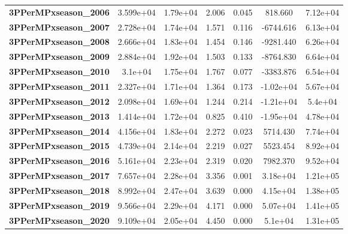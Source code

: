 \begin{center}
\begin{tabular}{lcccccc}
\textbf{3PPerMPxseason\_2006} &    3.599e+04  &     1.79e+04     &     2.006  &         0.045        &      818.660    &     7.12e+04     \\
\textbf{3PPerMPxseason\_2007} &    2.728e+04  &     1.74e+04     &     1.571  &         0.116        &    -6744.616    &     6.13e+04     \\
\textbf{3PPerMPxseason\_2008} &    2.666e+04  &     1.83e+04     &     1.454  &         0.146        &    -9281.440    &     6.26e+04     \\
\textbf{3PPerMPxseason\_2009} &    2.884e+04  &     1.92e+04     &     1.503  &         0.133        &    -8764.830    &     6.64e+04     \\
\textbf{3PPerMPxseason\_2010} &      3.1e+04  &     1.75e+04     &     1.767  &         0.077        &    -3383.876    &     6.54e+04     \\
\textbf{3PPerMPxseason\_2011} &    2.327e+04  &     1.71e+04     &     1.364  &         0.173        &    -1.02e+04    &     5.67e+04     \\
\textbf{3PPerMPxseason\_2012} &    2.098e+04  &     1.69e+04     &     1.244  &         0.214        &    -1.21e+04    &      5.4e+04     \\
\textbf{3PPerMPxseason\_2013} &    1.414e+04  &     1.72e+04     &     0.825  &         0.410        &    -1.95e+04    &     4.78e+04     \\
\textbf{3PPerMPxseason\_2014} &    4.156e+04  &     1.83e+04     &     2.272  &         0.023        &     5714.430    &     7.74e+04     \\
\textbf{3PPerMPxseason\_2015} &    4.739e+04  &     2.14e+04     &     2.219  &         0.027        &     5523.454    &     8.92e+04     \\
\textbf{3PPerMPxseason\_2016} &    5.161e+04  &     2.23e+04     &     2.319  &         0.020        &     7982.370    &     9.52e+04     \\
\textbf{3PPerMPxseason\_2017} &    7.657e+04  &     2.28e+04     &     3.356  &         0.001        &     3.18e+04    &     1.21e+05     \\
\textbf{3PPerMPxseason\_2018} &    8.992e+04  &     2.47e+04     &     3.639  &         0.000        &     4.15e+04    &     1.38e+05     \\
\textbf{3PPerMPxseason\_2019} &    9.566e+04  &     2.29e+04     &     4.171  &         0.000        &     5.07e+04    &     1.41e+05     \\
\textbf{3PPerMPxseason\_2020} &    9.109e+04  &     2.05e+04     &     4.450  &         0.000        &      5.1e+04    &     1.31e+05     \\

\end{tabular}
\end{center}

